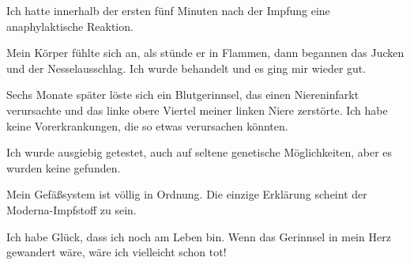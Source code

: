

Ich hatte innerhalb der ersten fünf Minuten nach der Impfung eine anaphylaktische Reaktion.

Mein Körper fühlte sich an, als stünde er in Flammen, dann begannen das Jucken und der Nesselausschlag. Ich wurde behandelt und es ging mir wieder gut.

Sechs Monate später löste sich ein Blutgerinnsel, das einen Niereninfarkt verursachte und das linke obere Viertel meiner linken Niere zerstörte. Ich habe keine Vorerkrankungen, die so etwas verursachen könnten.

Ich wurde ausgiebig getestet, auch auf seltene genetische Möglichkeiten, aber es wurden keine gefunden.

Mein Gefäßsystem ist völlig in Ordnung. Die einzige Erklärung scheint der Moderna-Impfstoff zu sein.

Ich habe Glück, dass ich noch am Leben bin. Wenn das Gerinnsel in mein Herz gewandert wäre, wäre ich vielleicht schon tot!
